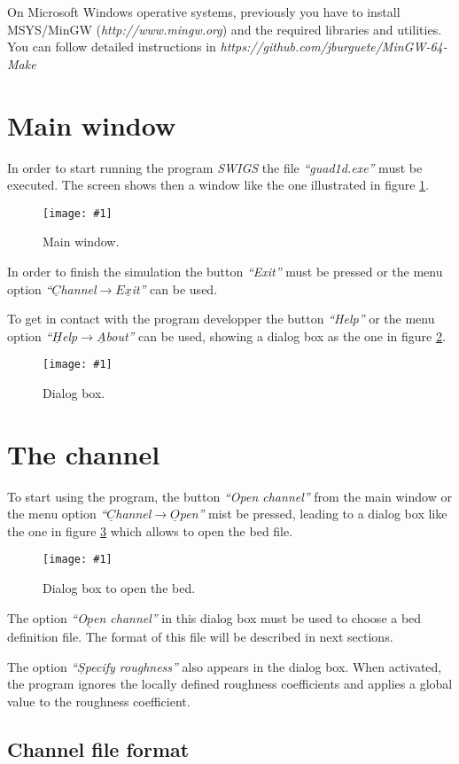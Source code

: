 \documentclass[a4paper,12pt]{article}
\newcommand{\fig}[3]
{
	\begin{figure}[ht!]
		\centering
		\texttt{[image: \#1]}
		\caption{#2.\label{#3}}
	\end{figure}
}
\newcommand{\swigs}{\emph{SWIGS}}
\newcommand{\IT}[1]{{\sl ``#1''}}
\begin{document}
On Microsoft Windows operative systems, previously you have to install
MSYS/MinGW (\emph{http://www.mingw.org}) and the required libraries and
utilities. You can follow detailed instructions in
\emph{https://github.com/jburguete/MinGW-64-Make}

\section{Main window}

In order to start running the program {\swigs} the file \IT{guad1d.exe} must
be executed. The screen shows then a window like the one illustrated in
figure \ref{FigSimulador}.
\fig{Simulator.ps}{Main window}{FigSimulador}

In order to finish the simulation the button \IT{Exit} must be pressed or the
menu option \IT{$\underline{C}$hannel$\rightarrow E\underline{x}$it} can be used.

To get in contact with the program developper the button \IT{Help} or the menu
option \IT{$\underline{H}$elp$\rightarrow\underline{A}$bout} can be used, showing
a dialog box as the one in figure \ref{FigAyuda}.
\fig{Help.ps}{Dialog box}{FigAyuda}

\section{The channel}

To start using the program, the button \IT{Open channel} from the main window or
the menu option \IT{$\underline{C}$hannel$\rightarrow\underline{O}$pen} mist be
pressed, leading to a dialog box like the one in figure \ref{FigCauce} which
allows to open the bed file. 
\fig{Channel.ps}{Dialog box to open the bed}{FigCauce}

The option \IT{O$\underline{p}$en channel} in this dialog box must be used to
choose a bed definition file. The format of this file will be described in next
sections.

The option \IT{$\underline{S}$pecify roughness} also appears in the dialog box.
When activated, the program ignores the locally defined roughness coefficients
and applies a global value to the roughness coefficient.

\subsection{Channel file format}
\end{document}
